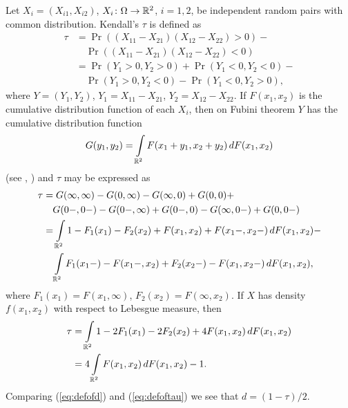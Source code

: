 \begin{rem}
  Let $X_i = (X_{i1}, X_{i2})$, $X_i \colon \Omega \to \mathbb{R}^2$, $i =
  1, 2$, be independent random pairs with common distribution.
  Kendall's $\tau$ is defined \cite [section~9.4, p.~474]
  {koronacki-mielniczuk-2001} \cite [section~4.4.2, p.~61]
  {terasvirta-tjostheim-granger-2010} \cite [section~2.1.9, p.~32]
  {joe-1997} as \[
  \begin{split}
  \tau & = \Pr((X_{11} - X_{21})(X_{12} - X_{22}) > 0) - \\
  & \quad \Pr((X_{11} - X_{21})(X_{12} - X_{22}) < 0) \\
  & = \Pr(Y_1 > 0, Y_2 > 0) + \Pr(Y_1 < 0, Y_2 < 0) - \\
  & \quad \Pr(Y_1 > 0, Y_2 < 0) - \Pr(Y_1 < 0, Y_2 > 0),
  \end{split} \] where $Y = (Y_1, Y_2)$, $Y_1 = X_{11} - X_{21}$,
  $Y_2 = X_{12} - X_{22}$. If $F(x_1, x_2)$ is the cumulative
  distribution function of each $X_i$, then on Fubini theorem $Y$ has
  the cumulative distribution function \[ G(y_1, y_2) = \int
  \limits_{\mathbb{R}^2} F(x_1 + y_1, x_2 + y_2) \, dF(x_1, x_2) \] (see
  \cite [p.~199, 640--641] {fisz-1969}, \cite [p.~258--259]
        {billingsley-2009}) and $\tau$ may be expressed
        as \[ \begin{split}
          \tau & = G(\infty, \infty) - G(0, \infty) - G(\infty, 0) +
          G(0, 0) + \\
          & \quad G(0-, 0-) - G(0-, \infty) + G(0-, 0) - G(\infty, 0-)
          + G(0, 0-) \\
          & = \int \limits_{\mathbb{R}^2} 1 - F_1(x_1) - F_2(x_2) + F(x_1,
          x_2) + F(x_1-, x_2-) \, dF(x_1, x_2) - \\
          & \quad \int \limits_{\mathbb{R}^2} F_1(x_1-) - F(x_1-, x_2) +
          F_2(x_2-) - F(x_1, x_2-) \, dF(x_1, x_2),
        \end{split} \]
        where $F_1(x_1) = F(x_1, \infty)$, $F_2(x_2) = F(\infty,
        x_2)$. If $X$ has density $f(x_1, x_2)$ with respect to
        Lebesgue measure, then
        \begin{equation} \label{eq:defoftau} \begin{split}
            \tau & = \int \limits_{\mathbb{R}^2} 1 - 2F_1(x_1) - 2F_2(x_2)
            + 4F(x_1, x_2) \, dF(x_1, x_2) \\
            & = 4 \int \limits_{\mathbb{R}^2} F(x_1, x_2) \, dF(x_1, x_2)
            - 1.
        \end{split} \end{equation}
        Comparing (\ref{eq:defofd}) and (\ref{eq:defoftau}) we see
        that $d = (1 - \tau) / 2$.
\end{rem}

